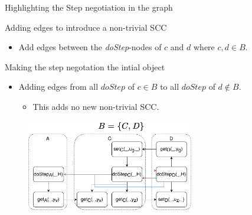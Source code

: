 \documentclass{beamer}
\begin{document}
\begin{frame}{Highlighting the Step negotiation in the graph}
    \begin{alertblock}{Adding edges to introduce a non-trivial SCC}
        \begin{itemize}
            \item Add edges between the \textit{doStep}-nodes of $c$ and $d$ where $c,d \in B$. 
        \end{itemize}
    \end{alertblock}
    \begin{block}{Making the step negotation the intial object}
        \begin{itemize}
            \item Adding edges from all $doStep$ of $c \in B$ to all $doStep$ of $d \notin B$.
            \begin{itemize}
                \item This adds no new non-trivial SCC.
            \end{itemize}
        \end{itemize} 
    \end{block}
    \begin{figure}[H]
        \centering
        \includegraphics[width=0.65\textwidth]{images/step_scenario_graph_extended.pdf}
      \end{figure}
\end{frame}
\end{document}
